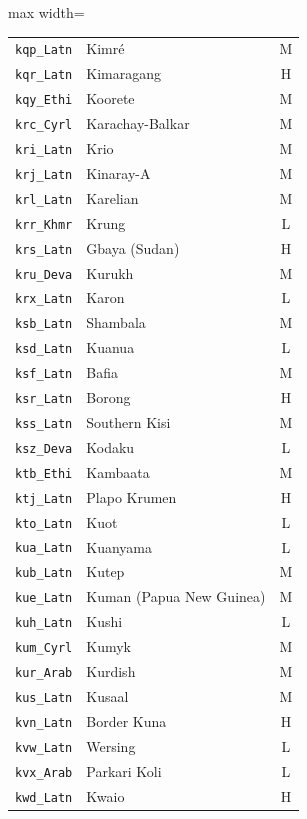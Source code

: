 {\begin{adjustbox}{max width=\textwidth}
\begin{tabular}{llc}
        \texttt{kqp\_Latn} & Kimré & M \\
        \texttt{kqr\_Latn} & Kimaragang & H \\
        \texttt{kqy\_Ethi} & Koorete & M \\
        \texttt{krc\_Cyrl} & Karachay-Balkar & M \\
        \texttt{kri\_Latn} & Krio & M \\
        \texttt{krj\_Latn} & Kinaray-A & M \\
        \texttt{krl\_Latn} & Karelian & M \\
        \texttt{krr\_Khmr} & Krung & L \\
        \texttt{krs\_Latn} & Gbaya (Sudan) & H \\
        \texttt{kru\_Deva} & Kurukh & M \\
        \texttt{krx\_Latn} & Karon & L \\
        \texttt{ksb\_Latn} & Shambala & M \\
        \texttt{ksd\_Latn} & Kuanua & L \\
        \texttt{ksf\_Latn} & Bafia & M \\
        \texttt{ksr\_Latn} & Borong & H \\
        \texttt{kss\_Latn} & Southern Kisi & M \\
        \texttt{ksz\_Deva} & Kodaku & L \\
        \texttt{ktb\_Ethi} & Kambaata & M \\
        \texttt{ktj\_Latn} & Plapo Krumen & H \\
        \texttt{kto\_Latn} & Kuot & L \\
        \texttt{kua\_Latn} & Kuanyama & L \\
        \texttt{kub\_Latn} & Kutep & M \\
        \texttt{kue\_Latn} & Kuman (Papua New Guinea) & M \\
        \texttt{kuh\_Latn} & Kushi & L \\
        \texttt{kum\_Cyrl} & Kumyk & M \\
        \texttt{kur\_Arab} & Kurdish & M \\
        \texttt{kus\_Latn} & Kusaal & M \\
        \texttt{kvn\_Latn} & Border Kuna & H \\
        \texttt{kvw\_Latn} & Wersing & L \\
        \texttt{kvx\_Arab} & Parkari Koli & L \\
        \texttt{kwd\_Latn} & Kwaio & H \\

\end{tabular}
\end{adjustbox}}

